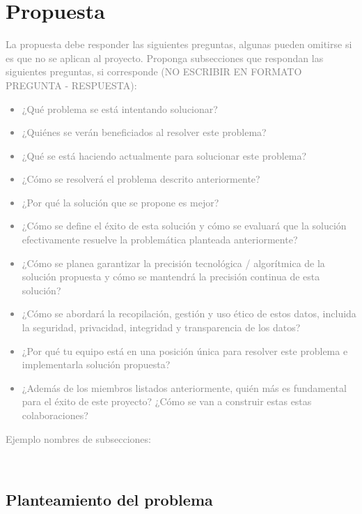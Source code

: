 \documentclass{amsart}
\begin{document}
\section{Propuesta} 
\noindent \textcolor{gray}{La propuesta debe responder las siguientes preguntas, algunas pueden omitirse si es que no se aplican al proyecto. Proponga subsecciones que respondan las siguientes preguntas, si  corresponde  (NO ESCRIBIR EN FORMATO PREGUNTA - RESPUESTA):  
\begin{itemize}
\item ¿Qué  problema  se  está  intentando  solucionar?
\item ¿Quiénes  se  verán  beneficiados  al  resolver  este problema?
\item¿Qué  se  está  haciendo  actualmente  para  solucionar  este  problema?
\item ¿Cómo  se  resolverá  el  problema  descrito  anteriormente?
\item ¿Por  qué  la  solución que  se propone  es  mejor?
\item ¿Cómo  se  define  el  éxito  de  esta  solución  y  cómo  se  evaluará  que  la  solución  efectivamente resuelve  la  problemática  planteada  anteriormente?
\item ¿Cómo  se  planea  garantizar  la  precisión  tecnológica  /  algorítmica  de  la  solución  propuesta  
y cómo  se  mantendrá  la  precisión  continua  de  esta  solución?
\item ¿Cómo  se  abordará  la  recopilación,  gestión  y  uso  ético  de  estos  datos,  incluida  la  
seguridad, privacidad,  integridad  y  transparencia  de  los  datos?
\item ¿Por  qué  tu  equipo  está  en  una  posición  única  para  resolver  este  problema  e  implementarla solución  propuesta?
\item ¿Además  de  los  miembros  listados  anteriormente,  quién  más  es  fundamental  para  el  éxito
de  este proyecto? ¿Cómo  se  van  a  construir  estas  estas  colaboraciones?
\end{itemize}}
\newpage


\thispagestyle{empty}

\noindent\textcolor{gray}{Ejemplo nombres de subsecciones:}

\



\subsection*{Planteamiento del problema}
\end{document}
